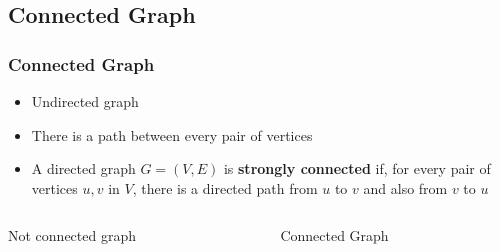 \documentclass[newPxFont,sthlmFooter,nooffset]{beamer}
\begin{document}
\subsection{Connected Graph}
\begin{frame}[t]
  \frametitle{Connected Graph}
  \begin{itemize}
  \item Undirected graph
  \item There is a path between every pair of vertices
  \end{itemize}
\bigskip
\begin{itemize}
\item A directed graph $G=(V, E)$ is \textbf{strongly connected} if, for every pair of vertices $u, v$ in $V$, there is a directed path from $u$ to $v$ and also from $v$ to $u$
\end{itemize}

\begin{columns}
  \begin{column}{0.4\textwidth}
      
Not connected graph
  \end{column}
  \begin{column}{0.4\textwidth}

Connected Graph      
  \end{column}
\end{columns}
\end{frame}
\end{document}
